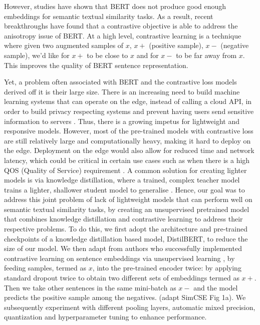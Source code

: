 \documentclass[10pt,twocolumn,letterpaper]{article}
\begin{document}
However, studies \cite{2104.08821} \cite{2105.11741} have shown that BERT does not produce good enough embeddings for semantic textual similarity tasks. As a result, recent breakthroughs \cite{2104.08821} \cite{1907.11692} have found that a contrastive objective is able to address the anisotropy issue of BERT. At a high level, contrastive learning is a technique where given two augmented samples of \(x\), \(x+\) (positive sample), \(x-\) (negative sample), we'd like for \(x+\) to be close to \(x\) and for \(x-\) to be far away from \(x\). This improves the quality of BERT sentence representation. 

Yet, a problem often associated with BERT and the contrastive loss models derived off it is their large size. There is an increasing need to build machine learning systems that can operate on the edge, instead of calling a cloud API, in order to build privacy respecting systems and prevent having users send sensitive information to servers \cite{10.3390/s22020450}. Thus, there is a growing impetus for lightweight and responsive models. However, most of the pre-trained models \cite{2104.08821} \cite{2105.11741} with contrastive loss are still relatively large and computationally heavy, making it hard to deploy on the edge. Deployment on the edge would also allow for reduced time and network latency, which could be critical in certain use cases such as when there is a high QOS (Quality of Service) requirement \cite{10.3390/s22020450}. A common solution for creating lighter models is via knowledge distillation, where a trained, complex teacher model trains  a lighter, shallower student model to generalise \cite{1910.01108}.
Hence, our goal was to address this joint problem of lack of lightweight models that can perform well on semantic textual similarity tasks, by creating an unsupervised pretrained model that combines knowledge distillation and contrastive learning to address their respective problems.  To do this, we first adopt the architecture and pre-trained checkpoints of a knowledge distillation based model, DistilBERT, to reduce the size of our model. We then adapt from authors who successfully implemented contrastive learning on sentence embeddings via unsupervised learning \cite{2104.08821}, by feeding samples, termed as \(x\), into the pre-trained encoder twice: by applying standard dropout twice to obtain two different sets of embeddings termed as \(x+\). Then we take other sentences in the same mini-batch as \(x-\) and the model predicts the positive sample among the negatives. (adapt SimCSE Fig 1a). We subsequently experiment with different pooling layers, automatic mixed precision, quantization and hyperparameter tuning to enhance performance.
\end{document}
